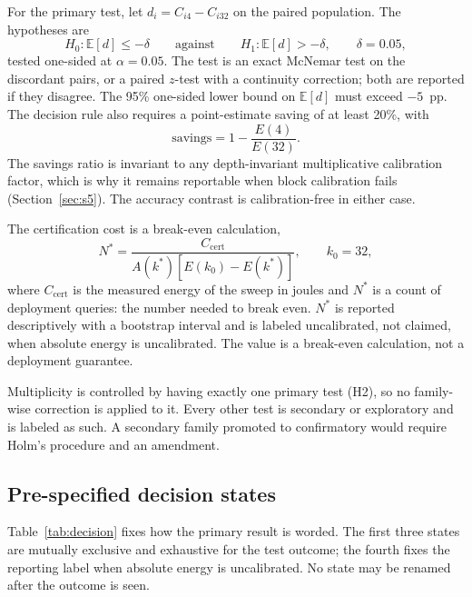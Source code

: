 For the primary test, let $d_i=C_{i4}-C_{i32}$ on the paired population. The hypotheses are
\begin{equation}
H_0:\mathbb{E}[d]\le-\delta
\qquad\text{against}\qquad
H_1:\mathbb{E}[d]>-\delta,
\qquad \delta=0.05,
\label{eq:ni}
\end{equation}
tested one-sided at $\alpha=0.05$. The test is an exact McNemar test on the discordant pairs, or
a paired $z$-test with a continuity correction; both are reported if they disagree. The 95\%
one-sided lower bound on $\mathbb{E}[d]$ must exceed $-5$~pp. The decision rule also requires a
point-estimate saving of at least 20\%, with
\begin{equation}
\mathrm{savings}=1-\frac{E(4)}{E(32)}.
\label{s:eq:savings}
\end{equation}
The savings ratio is invariant to any depth-invariant multiplicative calibration factor, which
is why it remains reportable when block calibration fails (Section~\ref{sec:s5}). The accuracy
contrast is calibration-free in either case.

The certification cost is a break-even calculation,
\begin{equation}
N^{*}=\frac{C_{\mathrm{cert}}}{A(k^{*})\left[E(k_0)-E(k^{*})\right]},
\qquad k_0=32,
\label{s:eq:nstar}
\end{equation}
where $C_{\mathrm{cert}}$ is the measured energy of the sweep in joules and $N^{*}$ is a count of
deployment queries: the number needed to break even. $N^{*}$ is reported descriptively with a
bootstrap interval and is labeled uncalibrated, not claimed, when absolute energy is
uncalibrated. The value is a break-even calculation, not a deployment guarantee.

Multiplicity is controlled by having exactly one primary test (H2), so no family-wise correction
is applied to it. Every other test is secondary or exploratory and is labeled as such. A
secondary family promoted to confirmatory would require Holm's procedure and an amendment.

\subsection{Pre-specified decision states}

Table~\ref{tab:decision} fixes how the primary result is worded. The first three states are
mutually exclusive and exhaustive for the test outcome; the fourth fixes the reporting label
when absolute energy is uncalibrated. No state may be renamed after the outcome is seen.

